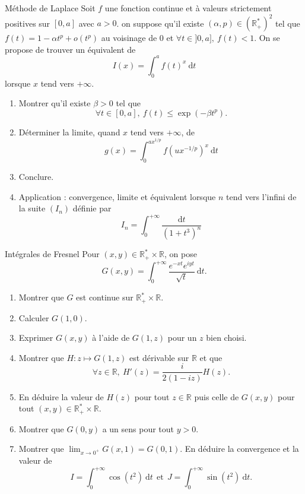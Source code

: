 \documentclass[french]{book}
\newcommand{\R}{\mathbb{R}}
\newcommand{\st}{^*}
\renewcommand{\d}{\text{d}}
\theoremstyle{definition}
\theoremstyle{remark}
\begin{document}
\begin{exo}[2]{Méthode de Laplace}
	Soit $f$ une fonction continue et à valeurs strictement positives sur $[0,a]$ avec $a>0$. on suppose qu'il existe $(\alpha,p)\in(\R_+\st)^2$ tel que $f(t)=1-\alpha t^p+o(t^p)$ au voisinage de $0$ et $\forall t\in]0,a],\ f(t)<1$. On se propose de trouver un équivalent de $$I(x)=\int_{0}^{a}f(t)^x\ \d t$$ lorsque $x$ tend vers $+\infty$.
	\begin{enumerate}
		\item Montrer qu'il existe $\beta>0$ tel que $$\forall t\in[0,a],\ f(t)\leqslant\exp(-\beta t^p).$$
		\item Déterminer la limite, quand $x$ tend vers $+\infty$, de $$g(x)=\int_{0}^{ax^{1/p}}f\left(ux^{-1/p}\right)^x\ \d t$$
		\item Conclure.
		\item Application : convergence, limite et équivalent lorsque $n$ tend vers l'infini de la suite $(I_n)$ définie par $$I_n=\int_{0}^{+\infty}\frac{\d t}{(1+t^3)^n}$$
	\end{enumerate}
\end{exo}

\begin{exo}[3]{Intégrales de Fresnel}
	Pour $(x,y)\in\R_+\st\times\R$, on pose $$G(x,y)=\int_{0}^{+\infty}\frac{e^{-xt}e^{iyt}}{\sqrt{t}}\ \d t.$$
	\begin{enumerate}
		\item Montrer que $G$ est continue sur $\R_+\st\times\R$.
		\item Calculer $G(1,0)$.
		\item Exprimer $G(x,y)$ à l'aide de $G(1,z)$ pour un $z$ bien choisi.
		\item Montrer que $H:z\mapsto G(1,z)$ est dérivable sur $\R$ et que $$\forall z\in\R,\ H'(z)=\frac{i}{2(1-iz)}H(z).$$
		\item En déduire la valeur de $H(z)$ pour tout $z\in\R$ puis celle de $G(x,y)$ pour tout $(x,y)\in\R_+\st\times\R$.
		\item Montrer que $G(0,y)$ a un sens pour tout $y>0$.
		\item Montrer que $\displaystyle\lim_{x\to 0^+}G(x,1)=G(0,1)$. En déduire la convergence et la valeur de $$I=\int_{0}^{+\infty}\cos(t^2)\ \d t \ \ \text{et} \ \ J=\int_{0}^{+\infty}\sin(t^2)\ \d t.$$
	\end{enumerate}
\end{exo}
\end{document}
